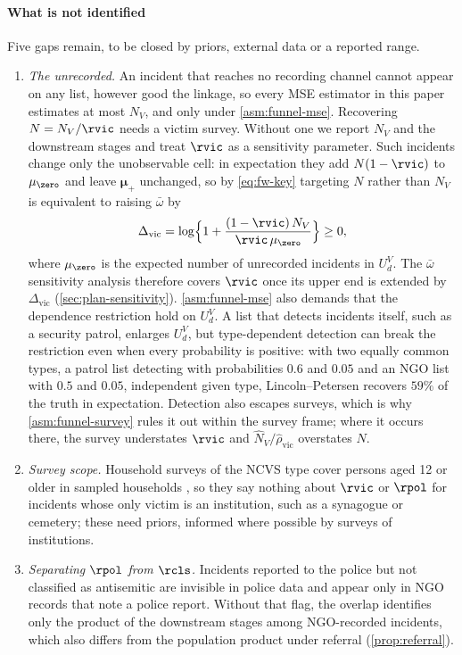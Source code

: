 \paragraph{What is not identified} Five gaps remain, to be closed by priors, external data or a reported range.
\begin{enumerate}[(1)]
  \item \emph{The unrecorded.} An incident that reaches no recording channel cannot appear on any list, however good the linkage, so every MSE estimator in this paper estimates at most $N_V$, and only under \ref{asm:funnel-mse}. Recovering $N=N_V/\rvic$ needs a victim survey. Without one we report $N_V$ and the downstream stages and treat $\rvic$ as a sensitivity parameter. Such incidents change only the unobservable cell: in expectation they add $N(1-\rvic)$ to $\mu_{\zero}$ and leave $\bm\mu_+$ unchanged, so by \eqref{eq:fw-key} targeting $N$ rather than $N_V$ is equivalent to raising $\bar\omega$ by
  \begin{equation}\label{eq:funnel-vic}
    \Delta_{\mathrm{vic}}=\log\Bigl\{1+\frac{(1-\rvic)\,N_V}{\rvic\,\mu_{\zero}}\Bigr\}\ge0,
  \end{equation}
  where $\mu_{\zero}$ is the expected number of unrecorded incidents in $U_d^V$. The $\bar\omega$ sensitivity analysis therefore covers $\rvic$ once its upper end is extended by $\Delta_{\mathrm{vic}}$ (\cref{sec:plan-sensitivity}). \ref{asm:funnel-mse} also demands that the dependence restriction hold on $U_d^V$. A list that detects incidents itself, such as a security patrol, enlarges $U_d^V$, but type-dependent detection can break the restriction even when every probability is positive: with two equally common types, a patrol list detecting with probabilities $0.6$ and $0.05$ and an NGO list with $0.5$ and $0.05$, independent given type, Lincoln--Petersen recovers $59\%$ of the truth in expectation. Detection also escapes surveys, which is why \ref{asm:funnel-survey} rules it out within the survey frame; where it occurs there, the survey understates $\rvic$ and $\widehat N_V/\hat\rho_{\mathrm{vic}}$ overstates $N$.
  \item \emph{Survey scope.} Household surveys of the NCVS type cover persons aged 12 or older in sampled households \citep{masucci2017,bjs2021hate}, so they say nothing about $\rvic$ or $\rpol$ for incidents whose only victim is an institution, such as a synagogue or cemetery; these need priors, informed where possible by surveys of institutions.
  \item \emph{Separating $\rpol$ from $\rcls$.} Incidents reported to the police but not classified as antisemitic are invisible in police data and appear only in NGO records that note a police report. Without that flag, the overlap identifies only the product of the downstream stages among NGO-recorded incidents, which also differs from the population product under referral (\cref{prop:referral}).

\end{enumerate}
